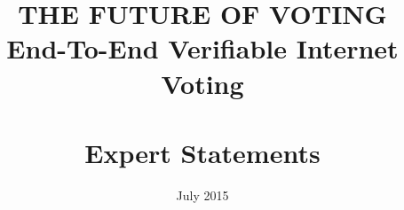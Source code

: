 \documentclass[oneside]{book}
\begin{document}
\ifstatementsonly
\title{\color{DarkGreen}\sffamily\bfseries THE FUTURE OF VOTING \\ \sffamily
End-To-End Verifiable Internet Voting \\ \ \\ \sffamily Expert Statements}
\date{\color{DarkGreen} July 2015}
\hypersetup{pageanchor=false}
\maketitle
\hypersetup{pageanchor=true}

\renewcommand{\contentsname}{\textcolor{DarkGreen}{CONTENTS}}
\renewcommand{\cfttoctitlefont}{\Huge\bfseries\sffamily}
\renewcommand{\cftchapfont}{\bfseries\sffamily}
\renewcommand{\cftsecfont}{\sffamily}
\renewcommand{\cftsubsecfont}{\sffamily}
\renewcommand{\cftsubsubsecfont}{\sffamily}
\renewcommand{\cftfigfont}{\sffamily}
\renewcommand{\cfttabfont}{\sffamily}
\renewcommand{\cftchappagefont}{\bfseries\sffamily}
\renewcommand{\cftsecpagefont}{ \sffamily}
\renewcommand{\cftsubsecpagefont}{ \sffamily}  
\renewcommand{\cftsubsubsecpagefont}{ \sffamily}
\renewcommand{\cftfigpagefont}{ \sffamily}
\renewcommand{\cfttabpagefont}{ \sffamily}
\tableofcontents
\clearpage\break
\else
\frontmatter

\hypersetup{pageanchor=false}

{}

\fi

\renewcommand{\contentsname}{\textcolor{DarkGreen}{CONTENTS}}
\renewcommand{\cfttoctitlefont}{\Huge\bfseries\sffamily}
\renewcommand{\cftchapfont}{\bfseries\sffamily}
\renewcommand{\cftsecfont}{\sffamily}
\renewcommand{\cftsubsecfont}{\sffamily}
\renewcommand{\cftsubsubsecfont}{\sffamily}
\renewcommand{\cftfigfont}{\sffamily}
\renewcommand{\cfttabfont}{\sffamily}
\renewcommand{\cftchappagefont}{\bfseries\sffamily}
\renewcommand{\cftsecpagefont}{ \sffamily}
\renewcommand{\cftsubsecpagefont}{ \sffamily}  
\renewcommand{\cftsubsubsecpagefont}{ \sffamily}
\renewcommand{\cftfigpagefont}{ \sffamily}
\renewcommand{\cfttabpagefont}{ \sffamily}
 
\end{document}
